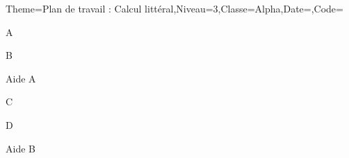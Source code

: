 \documentclass[12pt,french]{article}
\begin{document}
  \clearpage
\begin{Codes}{}{}
  \begin{Maquette}[PdT]{Theme=Plan de travail : Calcul littéral,Niveau=3,Classe=Alpha,Date={},Code={}}
    \begin{minipage}{0.35\linewidth}
      \begin{exercice}%
        A
      \end{exercice}
    \end{minipage}
    \hfill
    \begin{minipage}{0.3\linewidth}
      \begin{exercice}%
        B
      \end{exercice}
    \end{minipage}
    \hfill
    \begin{minipage}{0.15\linewidth}
      \begin{SOS}%
        Aide A
      \end{SOS}
    \end{minipage}
    
    \vspace*{2cm}
    
    \begin{minipage}{0.35\linewidth}
      \begin{exercice}%
        C
      \end{exercice}
    \end{minipage}
    \hfill
    \begin{minipage}{0.3\linewidth}
      \begin{exercice}%
        D
      \end{exercice}
    \end{minipage}
    \hfill
    \begin{minipage}{0.15\linewidth}
      \begin{SOS}%
        Aide B
      \end{SOS}
    \end{minipage}
  \end{Maquette}
\end{Codes}
\clearpage
\end{document}
